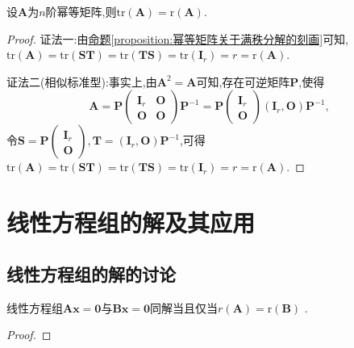 \documentclass[lang=cn,newtx,10pt,scheme=chinese]{elegantbook}
\begin{document}
\begin{corollary}[幂等矩阵的迹和秩相等]\label{corollary:幂等矩阵的迹和秩相等}
设\(\boldsymbol{A}\)为\(n\)阶幂等矩阵,则\(\mathrm{tr}(\boldsymbol{A})=\mathrm{r}(\boldsymbol{A})\).
\end{corollary}
\begin{proof}
    {\color{blue}证法一:}由\hyperref[proposition:幂等矩阵关于满秩分解的刻画]{命题\ref{proposition:幂等矩阵关于满秩分解的刻画}}可知,\(\mathrm{tr}(\boldsymbol{A})=\mathrm{tr}(\boldsymbol{S}\boldsymbol{T})=\mathrm{tr}(\boldsymbol{T}\boldsymbol{S})=\mathrm{tr}(\boldsymbol{I}_r)=r=\mathrm{r}(\boldsymbol{A})\).

    {\color{blue}证法二(相似标准型):}事实上,由\(\boldsymbol{A}^2=\boldsymbol{A}\)可知,存在可逆矩阵\(\boldsymbol{P}\),使得
    \[
    \boldsymbol{A}=\boldsymbol{P}\begin{pmatrix}
    \boldsymbol{I}_r&\boldsymbol{O}\\
    \boldsymbol{O}&\boldsymbol{O}
    \end{pmatrix}\boldsymbol{P}^{-1}=\boldsymbol{P}\begin{pmatrix}
    \boldsymbol{I}_r\\
    \boldsymbol{O}
    \end{pmatrix}(\boldsymbol{I}_r,\boldsymbol{O})\boldsymbol{P}^{-1},
    \]
    令\(\boldsymbol{S}=\boldsymbol{P}\begin{pmatrix}
    \boldsymbol{I}_r\\
    \boldsymbol{O}
    \end{pmatrix},\boldsymbol{T}=(\boldsymbol{I}_r,\boldsymbol{O})\boldsymbol{P}^{-1}\),可得\(\mathrm{tr}(\boldsymbol{A})=\mathrm{tr}(\boldsymbol{S}\boldsymbol{T})=\mathrm{tr}(\boldsymbol{T}\boldsymbol{S})=\mathrm{tr}(\boldsymbol{I}_r)=r=\mathrm{r}(\boldsymbol{A})\).
\end{proof}

\section{线性方程组的解及其应用}

\subsection{线性方程组的解的讨论}

\begin{proposition}\label{proposition:线性方程组同解系数矩阵秩相同}
线性方程组$\boldsymbol{Ax}=\mathbf{0}$与$\boldsymbol{Bx}=\mathbf{0}$同解当且仅当$r\left( \boldsymbol{A} \right) =\mathrm{r}\left( \boldsymbol{B} \right)$ .
\end{proposition}
\begin{proof}
    
\end{proof}
\end{document}

